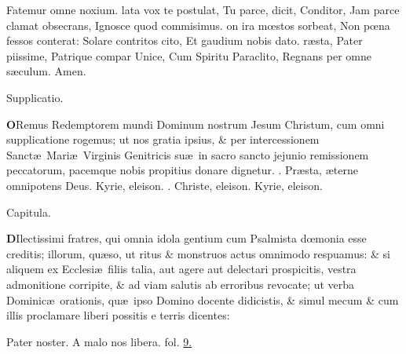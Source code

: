 \documentclass[letter,11pt]{book}
\makeatletter
\DeclareRobustCommand{\Rbar}{\vers@resp{0pt}{R}}
\newcommand{\vers@resp@sym}{\raisebox{0.2ex}{\rotatebox[origin=c]{-20}{$\m@th\rceil$}}}
\newcommand{\vers@resp}[2]{%
  {\ooalign{\hidewidth\kern#1\vers@resp@sym\hidewidth\cr#2\cr}}%
}%
\def\R{\color{Red} \Rbar . \color{black}}
\makeatother
\begin{document}
\begin{multicols*}{2}
\newline \indent Fatemur omne noxium.
lata vox te postulat,
\newline \indent Tu parce, dicit, Conditor,
\newline \indent Jam parce clamat obsecrans,
\newline \indent Ignosce quod commisimus.
on ira m\oe stos sorbeat,
\newline \indent Non p\oe na fessos conterat:
\newline \indent Solare contritos cito,
\newline \indent Et gaudium nobis dato.
r\ae sta, Pater piissime,
\newline \indent Patrique compar Unice,
\newline \indent Cum Spiritu Paraclito,
\newline \indent Regnans per omne s\ae culum. Amen.
\vspace{-.5em} \begin{center} \color{Red} Supplicatio. \color{black} \end{center} \vspace{-.5em}
\lettrine[lines=2]{\bfseries \color{Red} O}{}Remus Redemptorem mundi Dominum nostrum Jesum Christum, cum omni supplicatione rogemus; ut nos gratia ipsius, \& per intercessionem Sanct\ae \ Mari\ae \ Virginis Genitricis su\ae \ in sacro sancto jejunio remissionem peccatorum, pacemque nobis propitius donare dignetur. \R Pr\ae sta, \ae terne omnipotens Deus. Kyrie, eleison. \R Christe, eleison. Kyrie, eleison.
\vspace{-.5em} \begin{center} \color{Red} Capitula. \color{black} \end{center} \vspace{-.5em}
\lettrine[lines=2]{\bfseries \color{Red} D}{}Ilectissimi fratres, qui omnia idola gentium cum Psalmista d\oe monia esse creditis; illorum, qu\ae so, ut ritus \& monstruos actus omnimodo respuamus: \& si aliquem ex Ecclesi\ae \ filiis talia, aut agere aut delectari prospicitis, vestra admonitione corripite, \& ad viam salutis ab erroribus revocate; ut verba Dominic\ae \ orationis, qu\ae \ ipso Domino docente didicistis, \& simul mecum \& cum illis proclamare liberi possitis e terris dicentes:
\par Pater noster. A malo nos libera. \color{Red} fol. \color{black} \hyperlink{page.9}{9.}

\end{multicols*}
\end{document}
